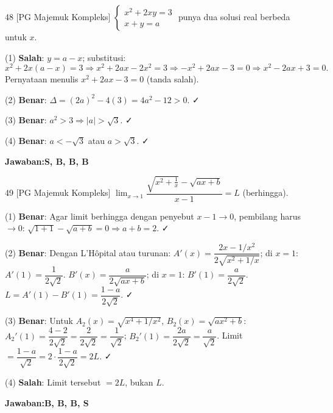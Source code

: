 \documentclass[11pt]{article}
\newcommand{\jawaban}[1]{\textbf{Jawaban:}\enspace\colorbox{gold!30}{\textbf{#1}}}
\begin{document}
\begin{soal}{48 \normalfont\small[PG Majemuk Kompleks]}
$\begin{cases}x^2+2xy=3\\x+y=a\end{cases}$ punya dua solusi real berbeda untuk $x$.
\end{soal}
\begin{pembox}
(1) \textbf{Salah}: $y=a-x$; substitusi:
\[
x^2+2x(a-x)=3\Rightarrow x^2+2ax-2x^2=3\Rightarrow-x^2+2ax-3=0\Rightarrow x^2-2ax+3=0.
\]
Pernyataan menulis $x^2+2ax-3=0$ (tanda salah).

(2) \textbf{Benar}: $\Delta=(2a)^2-4(3)=4a^2-12>0$. ✓

(3) \textbf{Benar}: $a^2>3\Rightarrow|a|>\sqrt3$. ✓

(4) \textbf{Benar}: $a<-\sqrt3$ atau $a>\sqrt3$. ✓

\jawaban{S, B, B, B}
\end{pembox}

\begin{soal}{49 \normalfont\small[PG Majemuk Kompleks]}
$\displaystyle\lim_{x\to1}\dfrac{\sqrt{x^2+\frac{1}{x}}-\sqrt{ax+b}}{x-1}=L$ (berhingga).
\end{soal}
\begin{pembox}
(1) \textbf{Benar}: Agar limit berhingga dengan penyebut $x-1\to0$, pembilang harus $\to0$:
$\sqrt{1+1}-\sqrt{a+b}=0\Rightarrow a+b=2$. ✓

(2) \textbf{Benar}: Dengan L'Hôpital atau turunan:
$A'(x)=\dfrac{2x-1/x^2}{2\sqrt{x^2+1/x}}$; di $x=1$: $A'(1)=\dfrac{1}{2\sqrt{2}}$.
$B'(x)=\dfrac{a}{2\sqrt{ax+b}}$; di $x=1$: $B'(1)=\dfrac{a}{2\sqrt{2}}$.
$L=A'(1)-B'(1)=\dfrac{1-a}{2\sqrt{2}}$. ✓

(3) \textbf{Benar}: Untuk $A_2(x)=\sqrt{x^4+1/x^2}$, $B_2(x)=\sqrt{ax^2+b}$:
$A_2'(1)=\dfrac{4-2}{2\sqrt{2}}=\dfrac{2}{2\sqrt{2}}=\dfrac{1}{\sqrt{2}}$; $B_2'(1)=\dfrac{2a}{2\sqrt{2}}=\dfrac{a}{\sqrt{2}}$.
Limit$=\dfrac{1-a}{\sqrt{2}}=2\cdot\dfrac{1-a}{2\sqrt{2}}=2L$. ✓

(4) \textbf{Salah}: Limit tersebut $=2L$, bukan $L$.

\jawaban{B, B, B, S}
\end{pembox}
\end{document}
